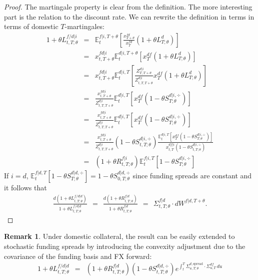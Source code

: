 \documentclass[11pt,english]{amsart}
\newcommand{\EE}{\mathbb{E}}
\theoremstyle{definition}
\newtheorem{rema}{Remark}
\begin{document}
\begin{proof}
The martingale property is clear from the definition. The more interesting part is the relation to the discount rate. We can rewrite the definition in terms in terms of domestic $T$-martingales: 
\begin{eqnarray*}
   1 + \theta L^{f/d|i}_{t,T;\theta} 
   &=& \EE^{f|i,T+\theta}_t\left[ \frac{x^{fd}_{T+\theta}}{x^{fd}_{T}} (1+\theta L^{d}_{T;\theta}) \right] \\
   &=& x^{fd|i}_{t,T+\theta} \EE^{d|i,T+\theta}_t\left[ x^{df}_{T} (1+\theta L^{d}_{T;\theta}) \right]  \\
   &=& x^{fd|i}_{t,T+\theta} \EE^{d|i,T}_t\left[\frac{Z^{d|i}_{T,T+\theta}}{Z^{d|i}_{t,T,T+\theta}} x^{df}_{T} (1+\theta L^{d}_{T;\theta}) \right]  \\
   &=&  \frac{x^{fd|i}_{t,T+\theta}}{Z^{d|i}_{t,T,T+\theta}} \EE^{d|i,T}_t\left[ x^{df}_{T} (1-\theta S^{d|i,\div}_{T;\theta}) \right]  \\
   &=&   \frac{x^{fd|i}_{t,T+\theta}}{Z^{d|i}_{t,T,T+\theta}}  \EE^{d|i,T}_t\left[ x^{df}_{T} (1-\theta S^{d|i,\div}_{T;\theta}) \right]  \\
   &=&   \frac{x^{fd|i}_{t,T+\theta}}{Z^{d|i}_{t,T,T+\theta}}   (1-\theta S^{d|i,\div}_{t,T;\theta}) \frac{ \EE^{d|i,T}_t\left[ x^{df}_{T} (1-\theta S^{d|i,\div}_{T;\theta}) \right]  }  { x^{df|i}_{t,T} (1-\theta S^{d|i,\div}_{t,T;\theta})  }  \\
   &=&  (1+\theta R^{f|i}_{t,T;\theta})  \EE^{f|i,T}_t\left[ 1-\theta S^{d|i,\div}_{T;\theta} \right]  
\end{eqnarray*} 
If $i=d$, $\EE^{f|d,T}_t\left[ 1-\theta S^{d|d,\div}_{T;\theta} \right]  = 1-\theta S^{d|d,\div}_{0,T;\theta}$ since funding spreads are constant and it follows that 
\begin{eqnarray*}
   \frac{d(1 + \theta L^{f/d|d}_{t,T;\theta})}{1 + \theta L^{f/d|d}_{t,T;\theta} }
   ~~=~~  \frac{d(1 + \theta R^{f|d}_{t,T;\theta})}{1 + \theta R^{f|d}_{t,T;\theta} }
   ~~=~~  \Sigma^{f|d}_{t,T;\theta}\cdot dW^{f|d,T+\theta}. 
\end{eqnarray*} 
\end{proof}


\begin{rema}
Under domestic collateral, the result can be easily extended to stochastic funding spreads by introducing the convexity adjustment due to the covariance of the funding basis and FX forward:
\begin{eqnarray}
   1 + \theta L^{f/d|d}_{t,T;\theta} 
   &=&  (1+\theta R^{f|d}_{t,T;\theta}) ( 1-\theta S^{d|d,\div}_{t,T;\theta} ) e^{\int_t^T \Sigma^{d,\mathrm{spread}}_{u,T;\theta} \cdot \Sigma^{df}_{u,T} \, du}
\end{eqnarray}
\end{rema}
\end{document}
